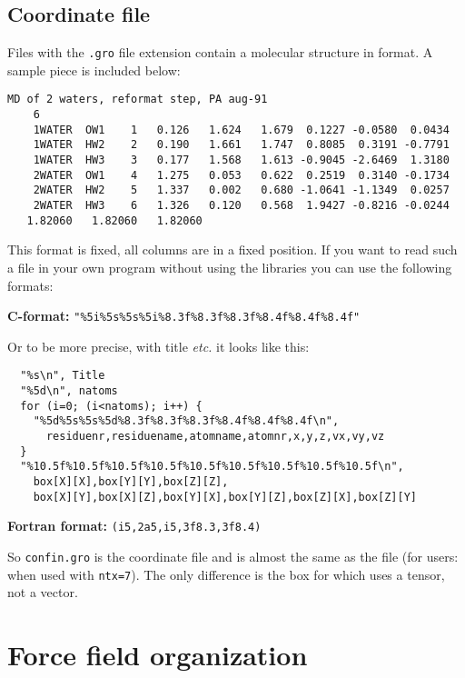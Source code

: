 \subsection{Coordinate file}
\label{subsec:grofile}
Files with the {\tt .gro} file extension contain a molecular structure in 
 format. A sample piece is included below:

{\small
\begin{verbatim}
MD of 2 waters, reformat step, PA aug-91
    6
    1WATER  OW1    1   0.126   1.624   1.679  0.1227 -0.0580  0.0434
    1WATER  HW2    2   0.190   1.661   1.747  0.8085  0.3191 -0.7791
    1WATER  HW3    3   0.177   1.568   1.613 -0.9045 -2.6469  1.3180
    2WATER  OW1    4   1.275   0.053   0.622  0.2519  0.3140 -0.1734
    2WATER  HW2    5   1.337   0.002   0.680 -1.0641 -1.1349  0.0257
    2WATER  HW3    6   1.326   0.120   0.568  1.9427 -0.8216 -0.0244
   1.82060   1.82060   1.82060
\end{verbatim}}

This format is fixed, {\ie} all columns are in a fixed position. If you
want to read such a file in your own program without using the
{\gromacs} libraries you can use the following formats:

{\bf C-format:} {\tt "\%5i\%5s\%5s\%5i\%8.3f\%8.3f\%8.3f\%8.4f\%8.4f\%8.4f"}

Or to be more precise, with title {\em etc.} it looks like this:

\begin{verbatim}
  "%s\n", Title
  "%5d\n", natoms
  for (i=0; (i<natoms); i++) {
    "%5d%5s%5s%5d%8.3f%8.3f%8.3f%8.4f%8.4f%8.4f\n",
      residuenr,residuename,atomname,atomnr,x,y,z,vx,vy,vz
  }
  "%10.5f%10.5f%10.5f%10.5f%10.5f%10.5f%10.5f%10.5f%10.5f\n",
    box[X][X],box[Y][Y],box[Z][Z],
    box[X][Y],box[X][Z],box[Y][X],box[Y][Z],box[Z][X],box[Z][Y]
\end{verbatim}

{\bf Fortran format:} {\tt (i5,2a5,i5,3f8.3,3f8.4)}

So {\tt confin.gro} is the {\gromacs} coordinate file and is almost
the same as the  file (for {\gromos} users: when used with
{\tt ntx=7}).  The only difference is the box for which {\gromacs} uses a
tensor, not a vector.



\section{Force field organization }
\label{sec:fforganization}

